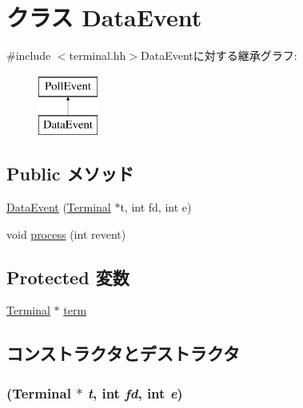 \hypertarget{classTerminal_1_1DataEvent}{
\section{クラス DataEvent}
\label{classTerminal_1_1DataEvent}
}


{\ttfamily \#include $<$terminal.hh$>$}DataEventに対する継承グラフ:\begin{figure}[H]
\begin{center}
\leavevmode
\includegraphics[height=2cm]{classTerminal_1_1DataEvent}
\end{center}
\end{figure}
\subsection*{Public メソッド}
\begin{DoxyCompactItemize}
\item 
\hyperlink{classTerminal_1_1DataEvent_aa2b8c97e0ec3ca3777a98e73f9072ec0}{DataEvent} (\hyperlink{classTerminal_1_1Terminal}{Terminal} $\ast$t, int fd, int e)
\item 
void \hyperlink{classTerminal_1_1DataEvent_aedacbaeee0c89ceca526874c34f6b20b}{process} (int revent)
\end{DoxyCompactItemize}
\subsection*{Protected 変数}
\begin{DoxyCompactItemize}
\item 
\hyperlink{classTerminal_1_1Terminal}{Terminal} $\ast$ \hyperlink{classTerminal_1_1DataEvent_a61b35a33209eb5f0de1f6f97f543ef92}{term}
\end{DoxyCompactItemize}


\subsection{コンストラクタとデストラクタ}
\hypertarget{classTerminal_1_1DataEvent_aa2b8c97e0ec3ca3777a98e73f9072ec0}{
\subsubsection[{DataEvent}]{ ({\bf Terminal} $\ast$ {\em t}, \/  int {\em fd}, \/  int {\em e})}}
\label{classTerminal_1_1DataEvent_aa2b8c97e0ec3ca3777a98e73f9072ec0}



